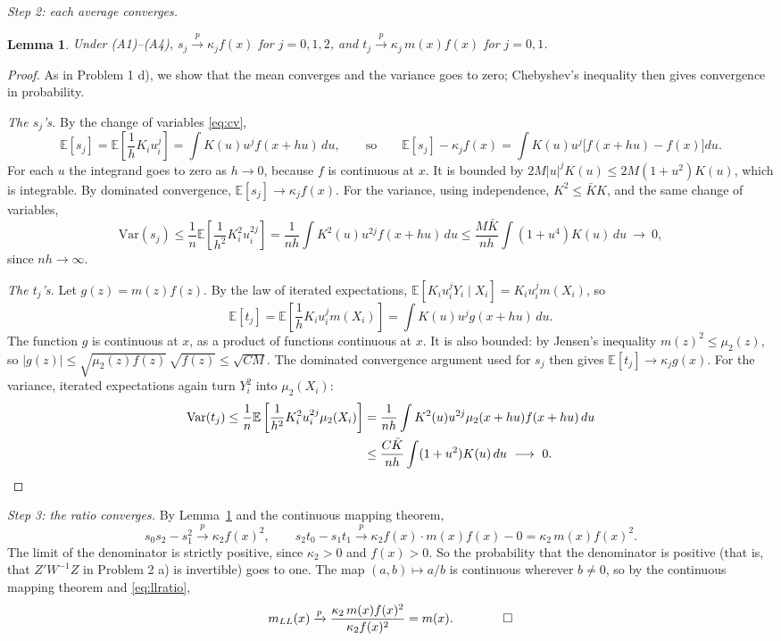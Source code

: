 \documentclass[11pt]{article}
\newcommand{\E}{\mathbb{E}}
\newcommand{\Var}{\mathrm{Var}}
\theoremstyle{plain}
\newtheorem{lemma}[proposition]{Lemma}
\begin{document}
\emph{Step 2: each average converges.}
\begin{lemma}\label{lem:moments}
Under (A1)--(A4), $s_j\xrightarrow{p}\kappa_jf(x)$ for $j=0,1,2$, and $t_j\xrightarrow{p}\kappa_j\,m(x)f(x)$ for $j=0,1$.
\end{lemma}
\begin{proof}
As in Problem 1 d), we show that the mean converges and the variance goes to zero; Chebyshev's inequality then gives convergence in probability.

\emph{The $s_j$'s.} By the change of variables \eqref{eq:cv},
\[
\E[s_j] = \E\left[\frac1hK_iu_i^j\right] = \int K(u)u^jf(x+hu)\,du,
\qquad\text{so}\qquad
\E[s_j]-\kappa_jf(x) = \int K(u)u^j\big[f(x+hu)-f(x)\big]du .
\]
For each $u$ the integrand goes to zero as $h\to 0$, because $f$ is continuous at $x$. It is bounded by $2M|u|^jK(u)\le 2M(1+u^2)K(u)$, which is integrable. By dominated convergence, $\E[s_j]\to\kappa_jf(x)$. For the variance, using independence, $K^2\le\bar KK$, and the same change of variables,
\[
\Var(s_j)\le\frac1n\E\left[\frac1{h^2}K_i^2u_i^{2j}\right] = \frac1{nh}\int K^2(u)u^{2j}f(x+hu)\,du \le \frac{M\bar K}{nh}\int(1+u^4)K(u)\,du\ \longrightarrow\ 0,
\]
since $nh\to\infty$.

\emph{The $t_j$'s.} Let $g(z)=m(z)f(z)$. By the law of iterated expectations, $\E[K_iu_i^jY_i\mid X_i]=K_iu_i^jm(X_i)$, so
\[
\E[t_j] = \E\left[\frac1hK_iu_i^jm(X_i)\right] = \int K(u)u^jg(x+hu)\,du .
\]
The function $g$ is continuous at $x$, as a product of functions continuous at $x$. It is also bounded: by Jensen's inequality $m(z)^2\le\mu_2(z)$, so $|g(z)|\le\sqrt{\mu_2(z)f(z)}\,\sqrt{f(z)}\le\sqrt{CM}$. The dominated convergence argument used for $s_j$ then gives $\E[t_j]\to\kappa_jg(x)$. For the variance, iterated expectations again turn $Y_i^2$ into $\mu_2(X_i)$:
\begin{align*}
\Var(t_j)\le\frac1n\E\left[\frac1{h^2}K_i^2u_i^{2j}\mu_2(X_i)\right] &= \frac1{nh}\int K^2(u)u^{2j}\mu_2(x+hu)f(x+hu)\,du\\
&\le\frac{C\bar K}{nh}\int(1+u^2)K(u)\,du\ \longrightarrow\ 0. \qedhere
\end{align*}
\end{proof}

\emph{Step 3: the ratio converges.} By Lemma~\ref{lem:moments} and the continuous mapping theorem,
\[
s_0s_2-s_1^2\xrightarrow{p}\kappa_2f(x)^2,\qquad s_2t_0-s_1t_1\xrightarrow{p}\kappa_2f(x)\cdot m(x)f(x)-0 = \kappa_2\,m(x)f(x)^2 .
\]
The limit of the denominator is strictly positive, since $\kappa_2>0$ and $f(x)>0$. So the probability that the denominator is positive (that is, that $Z'W^{-1}Z$ in Problem 2 a) is invertible) goes to one. The map $(a,b)\mapsto a/b$ is continuous wherever $b\neq 0$, so by the continuous mapping theorem and \eqref{eq:llratio},
\[
m_{LL}(x)\xrightarrow{p}\frac{\kappa_2\,m(x)f(x)^2}{\kappa_2f(x)^2} = m(x). \qquad\qed
\]
\end{document}
